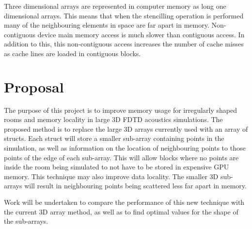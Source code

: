 \documentclass[a4paper,12pt]{article}
\begin{document}
Three dimensional arrays are represented in computer memory as long one dimensional arrays. This means that when the stencilling operation is performed many of the neighbouring elements in space are far apart in memory. Non-contiguous device main memory access is much slower than contiguous access. In addition to this, this non-contiguous access increases the number of cache misses as cache lines are loaded in contiguous blocks.




\section{Proposal}

The purpose of this project is to improve memory usage for irregularly shaped rooms and memory locality in large 3D FDTD acoustics simulations. The proposed method is to replace the large 3D arrays currently used with an array of structs. Each struct will store a smaller sub-array containing points in the simulation, as well as information on the location of neighbouring points to those points of the edge of each sub-array. This will allow blocks where no points are inside the room being simulated to not have to be stored in expensive GPU memory. This technique may also improve data locality. The smaller 3D sub-arrays will result in neighbouring points being scattered less far apart in memory. 

Work will be undertaken to compare the performance of this new technique with the current 3D array method, as well as to find optimal values for the shape of the sub-arrays.


\end{document}
